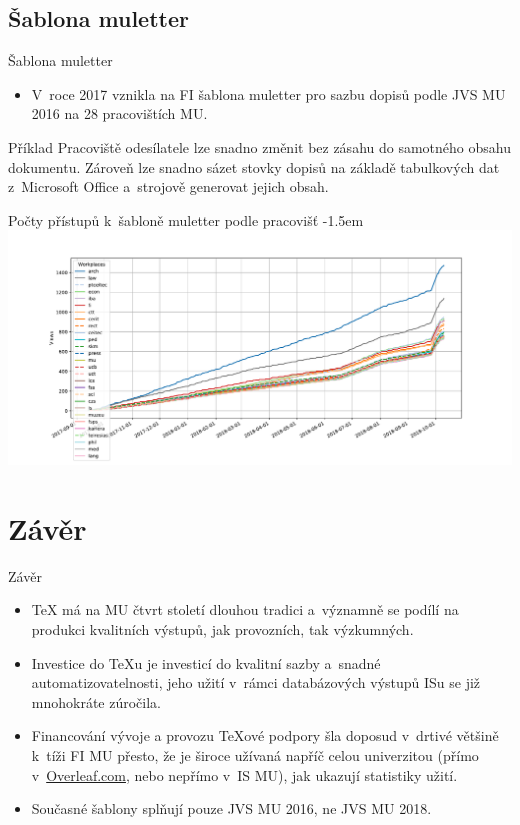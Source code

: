 \documentclass[
  aspectratio=169,
]{beamer}
\makeatletter
\newcommand\odkaz[2]{\textcolor{mubeamer@base}{\href{#1}{#2}}}
\makeatother
\begin{document}
\subsection{Šablona muletter}

\begin{frame}{Šablona muletter}
\begin{itemize}
\item V~roce 2017 vznikla na FI \alert{šablona muletter pro sazbu dopisů podle JVS MU 2016 na 28 pracovištích MU}.
\end{itemize}

\begin{block}{Příklad}
Pracoviště odesílatele lze snadno změnit bez zásahu do samotného obsahu dokumentu. Zároveň lze snadno sázet stovky dopisů na základě tabulkových dat z~Microsoft Office a~strojově generovat jejich obsah.
\end{block}
\end{frame}

\begin{frame}{Počty přístupů k~šabloně muletter podle pracovišť}
\kern-1.5em\leavevmode\relax
\includegraphics[width=\textwidth]{figs/muletter}
\end{frame}

\section{Závěr}

\begin{frame}{Závěr}
\begin{itemize}
\item \alert{\TeX{} má na MU čtvrt století dlouhou tradici} a~významně se podílí na produkci kvalitních výstupů, jak provozních, tak výzkumných.
\item Investice do \TeX u je investicí do \alert{kvalitní sazby} a~\alert{snadné automatizovatelnosti}, jeho užití v~rámci databázových výstupů ISu se již mnohokráte zúročila. 
\item Financování vývoje a provozu \TeX ové podpory šla doposud v~drtivé většině k~tíži FI MU přesto, že je \alert{široce užívaná napříč celou univerzitou} (přímo v~\odkaz{https://www.overleaf.com/edu/fimuni}{Overleaf.com}, nebo nepřímo v~IS MU), jak ukazují statistiky užití.
\item Současné šablony splňují pouze JVS MU 2016, ne JVS MU 2018.
\end{itemize}
\end{frame}
\end{document}
